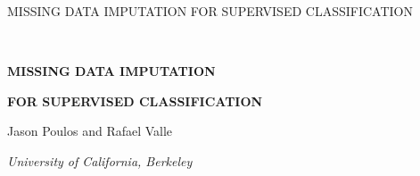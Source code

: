 \documentclass[10pt]{book}
\theoremstyle{definition}
\begin{document}

\renewcommand{\baselinestretch}{2}


{\hfill {\footnotesize\rm MISSING DATA IMPUTATION FOR SUPERVISED CLASSIFICATION} \hfill}

\renewcommand{\thefootnote}{}
$\ $\par


\fontsize{12}{14pt plus.8pt minus .6pt}\selectfont \vspace{0.8pc}
\centerline{\large\bf MISSING DATA IMPUTATION }
\vspace{2pt} \centerline{\large\bf  FOR SUPERVISED CLASSIFICATION}
\vspace{.4cm} \centerline{Jason Poulos and Rafael Valle} \vspace{.4cm} \centerline{\it
University of California, Berkeley} \vspace{.55cm} \fontsize{9}{11.5pt plus.8pt minus
.6pt}\selectfont

\end{document}

